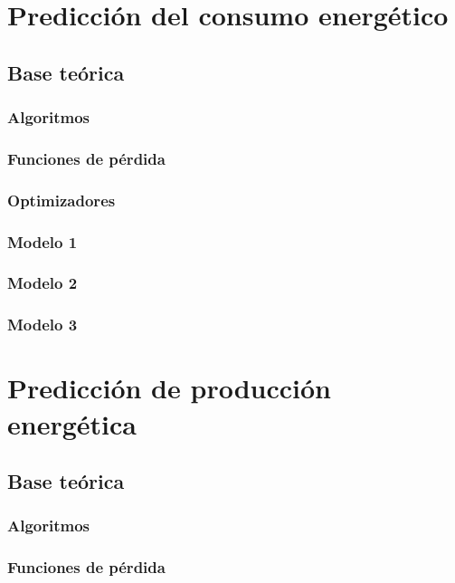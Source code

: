\documentclass[a4paper,12pt]{article}
\begin{document}
\section{Predicción del consumo energético}

\subsection{Base teórica}

\subsubsection{Algoritmos}

\subsubsection{Funciones de pérdida}

\subsubsection{Optimizadores}

\subsubsection{Modelo 1}

\subsubsection{Modelo 2}

\subsubsection{Modelo 3}

\section{Predicción de producción energética}

\subsection{Base teórica}

\subsubsection{Algoritmos}

\subsubsection{Funciones de pérdida}
\end{document}
